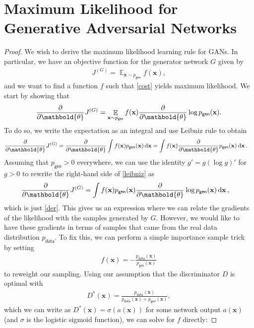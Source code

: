 \documentclass[table]{article}
\def\*#1{\mathbf{#1}}
\DeclareMathOperator{\ex}{\mathbb{E}}
\begin{document}
\section{Maximum Likelihood for Generative Adversarial Networks}

\begin{proof}
We wish to derive the maximum likelihood learning rule for GANs. In particular, we have an objective function for the generator network $G$ given by
\begin{align}
  J^{(G)} = \ex_{\*x \sim p_{\textsf{gen}}} f(\*x), \label{cost}
\end{align}
and we want to find a function $f$ such that \eqref{cost} yields maximum likelihood. We start by showing that
\begin{align}
  \pdv{\mathbold{\theta}} J^{(G)} = \ex_{\*x \sim p_{\textsf{gen}}} f(\*x) \pdv{\mathbold{\theta}} \log p_{\textsf{gen}}(\*x).\label{der}  
\end{align}
To do so, we write the expectation as an integral and use Leibniz rule to obtain
\begin{align}
  \pdv{\mathbold{\theta}} J^{(G)} &=  \pdv{\mathbold{\theta}} \int f(\*x)p_{\textsf{gen}}(\*x) \dd{\*x} 
  = \int f(\*x) \pdv{\mathbold{\theta}} p_{\textsf{gen}}(\*x) \dd{\*x}. \label{leibniz}
\end{align}
Assuming that $p_\textsf{gen} > 0$ everywhere, we can use the identity $g' = g(\log g)'$ for $g>0$ to rewrite the right-hand side of \eqref{leibniz} as
\begin{align}
  \pdv{\mathbold{\theta}} J^{(G)}& = \int f(\*x)p_{\textsf{gen}}(\*x)  \pdv{\mathbold{\theta}} \log p_{\textsf{gen}}(\*x) \dd{\*x},
\end{align}
which is just \eqref{der}. This gives us an expression where we can relate the gradients of the likelihood with the samples generated by $G$. However, we would like to have these gradients in terms of samples that came from the real data distribution $p_\textsf{data}$. To fix this, we can perform a simple importance sample trick by setting
\begin{align*}
  f(\*x) = -\frac{p_\textsf{data}(\*x)}{p_\textsf{gen}(\*x)}
\end{align*}
to reweight our sampling. Using our assumption that the discriminator $D$ is optimal with 
\begin{align*}
  D^*(\*x) = \frac{p_\textsf{data}(\*x)}{p_\textsf{data}(\*x) + p_\textsf{gen}(\*x)},
\end{align*}
which we can write as $D^*(\*x) = \sigma(a(\*x))$ for some network output $a(\*x)$ (and $\sigma$ is the logistic sigmoid function), we can solve for $f$ directly:

\end{proof}
\end{document}

